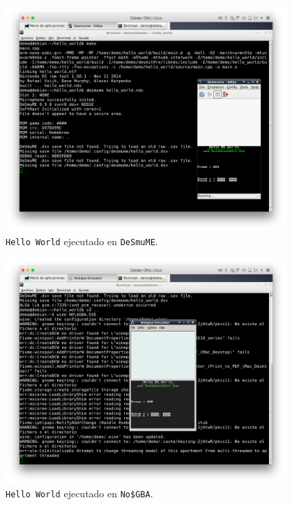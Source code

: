 \begin{figure}[h!]
	\caption{{\tt Hello World} ejecutado en {\tt DeSmuME}.}
	\label{fig:dependency}
	\centering
	\includegraphics[width=0.95\textwidth]{P1Media/DeSmuME}
\end{figure}
	
\begin{figure}[h!]
	\caption{{\tt Hello World} ejecutado en {\tt No\$GBA}.}
	\label{fig:dependency}
	\centering
	\includegraphics[width=0.95\textwidth]{P1Media/NoCash}
\end{figure}

